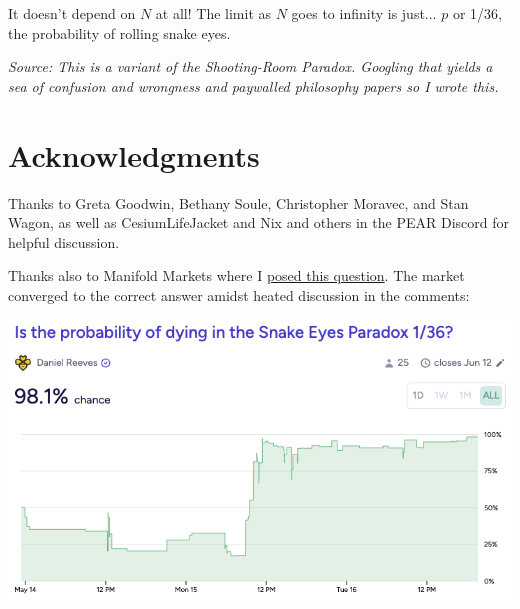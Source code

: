 \documentclass[article,twocolumn]{memoir}
\begin{document}
It doesn't depend on $N$ at all!
The limit as $N$ goes to infinity is just... 
$p$ or 1/36, the probability of rolling snake eyes.
\qedsymbol{}

\vspace{2em}
\noindent
\emph{Source: This is a variant of the Shooting-Room Paradox.
Googling that yields a sea of confusion and wrongness and paywalled philosophy papers so I wrote this.}


\chapter*{Acknowledgments}

Thanks to 
Greta Goodwin, 
Bethany Soule, 
Christopher Moravec,
and Stan Wagon, as well as
CesiumLifeJacket and Nix and others in the PEAR Discord for helpful discussion.

Thanks also to Manifold Markets where I 
\href{https://manifold.markets/dreev/is-the-probability-of-dying-in-the}{posed this question}.
The market converged to the correct answer amidst heated discussion in the comments:

\vspace{2em}
\noindent
\includegraphics[width=\linewidth]{manifold-snakeeyes}


\end{document}
